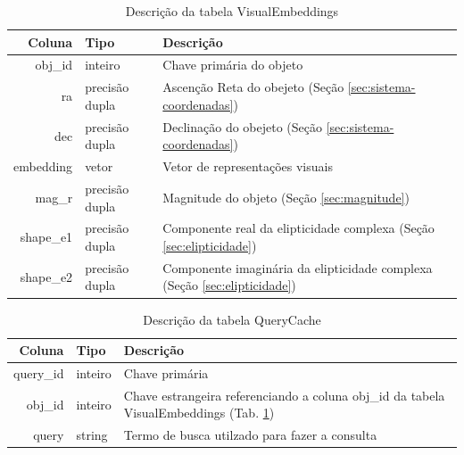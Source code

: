 \begin{table}[!ht]
  \centering
  \caption{Descrição da tabela VisualEmbeddings}
  \label{tab:VisualEmbeddings}
  \begin{tabular}{rlp{.6\linewidth}}
    \toprule
    Coluna    & Tipo           & Descrição                                                                     \\
    \midrule
    obj\_id   & inteiro        & Chave primária do objeto                                                      \\
    ra        & precisão dupla & Ascenção Reta do obejeto (Seção \ref{sec:sistema-coordenadas})                \\
    dec       & precisão dupla & Declinação do obejeto (Seção \ref{sec:sistema-coordenadas})                   \\
    embedding & vetor          & Vetor de representações visuais                                               \\
    mag\_r    & precisão dupla & Magnitude do objeto (Seção \ref{sec:magnitude})                               \\
    shape\_e1 & precisão dupla & Componente real da elipticidade complexa (Seção \ref{sec:elipticidade})       \\
    shape\_e2 & precisão dupla & Componente imaginária da elipticidade complexa (Seção \ref{sec:elipticidade}) \\
    \bottomrule
  \end{tabular}
\end{table}


\begin{table}[!ht]
  \centering
  \caption{Descrição da tabela QueryCache}
  \label{tab:QueryCache}
  \begin{tabular}{rlp{.6\linewidth}}
    \toprule
    Coluna    & Tipo    & Descrição                                                                                                     \\
    \midrule
    query\_id & inteiro & Chave primária                                                                                                \\
    obj\_id   & inteiro & Chave estrangeira referenciando a coluna obj\_id da tabela VisualEmbeddings (Tab. \ref{tab:VisualEmbeddings}) \\
    query     & string  & Termo de busca utilzado para fazer a consulta                                                                 \\
    \bottomrule
  \end{tabular}
\end{table}




